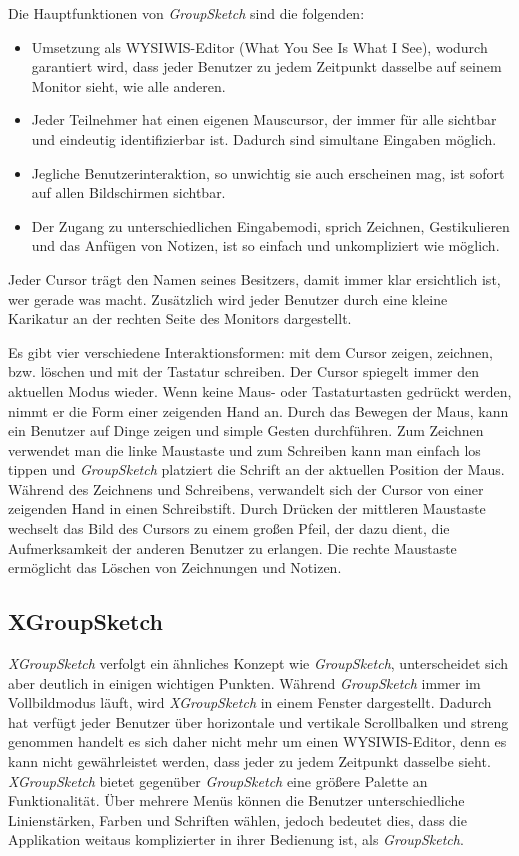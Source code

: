 Die Hauptfunktionen von \emph{GroupSketch} sind die folgenden:
\begin{itemize}
	\item
	Umsetzung als WYSIWIS-Editor (What You See Is What I See), wodurch garantiert wird, dass jeder Benutzer zu jedem Zeitpunkt dasselbe auf seinem Monitor sieht, wie alle anderen.
	\item
	Jeder Teilnehmer hat einen eigenen Mauscursor, der immer für alle sichtbar und eindeutig identifizierbar ist. Dadurch sind simultane Eingaben möglich.
	\item
	Jegliche Benutzerinteraktion, so unwichtig sie auch erscheinen mag, ist sofort auf allen Bildschirmen sichtbar.
	\item
	Der Zugang zu unterschiedlichen Eingabemodi, sprich Zeichnen, Gestikulieren und das Anfügen von Notizen, ist so einfach und unkompliziert wie möglich. 
\end{itemize}

Jeder Cursor trägt den Namen seines Besitzers, damit immer klar ersichtlich ist, wer gerade was macht. Zusätzlich wird jeder Benutzer durch eine kleine Karikatur an der rechten Seite des Monitors dargestellt.

Es gibt vier verschiedene Interaktionsformen: mit dem Cursor zeigen, zeichnen, bzw. löschen und mit der Tastatur schreiben. Der Cursor spiegelt immer den aktuellen Modus wieder. Wenn keine Maus- oder Tastaturtasten gedrückt werden, nimmt er die Form einer zeigenden Hand an. Durch das Bewegen der Maus, kann ein Benutzer auf Dinge zeigen und simple Gesten durchführen. Zum Zeichnen verwendet man die linke Maustaste und zum Schreiben kann man einfach los tippen und \emph{GroupSketch} platziert die Schrift an der aktuellen Position der Maus. Während des Zeichnens und Schreibens, verwandelt sich der Cursor von einer zeigenden Hand in einen Schreibstift. Durch Drücken der mittleren Maustaste wechselt das Bild des Cursors zu einem großen Pfeil, der dazu dient, die Aufmerksamkeit der anderen Benutzer zu erlangen. Die rechte Maustaste ermöglicht das Löschen von Zeichnungen und Notizen. 

\subsection{XGroupSketch}
\emph{XGroupSketch} verfolgt ein ähnliches Konzept wie \emph{GroupSketch}, unterscheidet sich aber deutlich in einigen wichtigen Punkten. Während \emph{GroupSketch} immer im Vollbildmodus läuft, wird \emph{XGroupSketch} in einem Fenster dargestellt. Dadurch hat verfügt jeder Benutzer über horizontale und vertikale Scrollbalken und streng genommen handelt es sich daher nicht mehr um einen WYSIWIS-Editor, denn es kann nicht gewährleistet werden, dass jeder zu jedem Zeitpunkt dasselbe sieht. \emph{XGroupSketch} bietet gegenüber \emph{GroupSketch} eine größere Palette an Funktionalität. Über mehrere Menüs können die Benutzer unterschiedliche Linienstärken, Farben und Schriften wählen, jedoch bedeutet dies, dass die Applikation weitaus komplizierter in ihrer Bedienung ist, als \emph{GroupSketch}.

